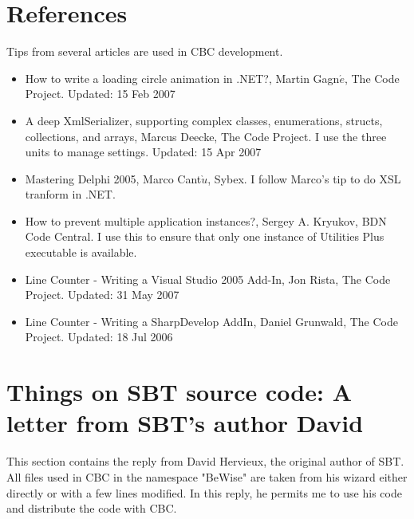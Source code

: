 \documentclass{article}
\begin{document}
\section{References}
Tips from several articles are used in CBC development.

\begin{itemize}



  \item How to write a loading circle animation in .NET?, Martin Gagn$\acute{e}$, The
  Code Project. Updated: 15 Feb 2007

  \item A deep XmlSerializer, supporting complex classes, enumerations,
  structs, collections, and arrays, Marcus Deecke, The Code Project. I use the
  three units to manage settings. Updated: 15 Apr 2007

  \item Mastering Delphi 2005, Marco Cant$\grave{u}$, Sybex. I follow Marco's
  tip to do XSL tranform in .NET.

  \item How to prevent multiple application instances?, Sergey A. Kryukov, BDN
  Code Central. I use this to ensure that only one instance of Utilities Plus
  executable is available.

  \item Line Counter - Writing a Visual Studio 2005 Add-In, Jon Rista, The Code
  Project. 	Updated: 31 May 2007

  \item Line Counter - Writing a SharpDevelop AddIn, Daniel Grunwald, The Code
  Project. Updated: 18 Jul 2006
\end{itemize}

\appendix
\section{Things on SBT source code: A letter from SBT's author David}
\label{sec:sbt}
This section contains the reply from David Hervieux, the original author of
SBT. All files used in CBC in the namespace "BeWise" are taken from his wizard
either directly or with a few lines modified. In this reply, he permits me to
use his code and distribute the code with CBC.
\end{document}
